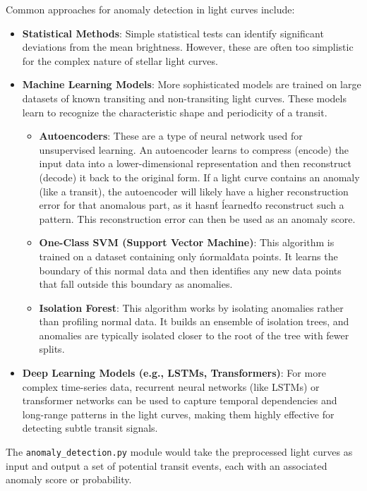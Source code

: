 \documentclass{article}
\begin{document}
Common approaches for anomaly detection in light curves include:

\begin{itemize}
    \item \textbf{Statistical Methods}: Simple statistical tests can identify significant deviations from the mean brightness. However, these are often too simplistic for the complex nature of stellar light curves.

    \item \textbf{Machine Learning Models}: More sophisticated models are trained on large datasets of known transiting and non-transiting light curves. These models learn to recognize the characteristic shape and periodicity of a transit.
    \begin{itemize}
        \item \textbf{Autoencoders}: These are a type of neural network used for unsupervised learning. An autoencoder learns to compress (encode) the input data into a lower-dimensional representation and then reconstruct (decode) it back to the original form. If a light curve contains an anomaly (like a transit), the autoencoder will likely have a higher reconstruction error for that anomalous part, as it hasn\'t \'learned\' to reconstruct such a pattern. This reconstruction error can then be used as an anomaly score.
        \item \textbf{One-Class SVM (Support Vector Machine)}: This algorithm is trained on a dataset containing only \'normal\' data points. It learns the boundary of this normal data and then identifies any new data points that fall outside this boundary as anomalies.
        \item \textbf{Isolation Forest}: This algorithm works by isolating anomalies rather than profiling normal data. It builds an ensemble of isolation trees, and anomalies are typically isolated closer to the root of the tree with fewer splits.
    \end{itemize}

    \item \textbf{Deep Learning Models (e.g., LSTMs, Transformers)}: For more complex time-series data, recurrent neural networks (like LSTMs) or transformer networks can be used to capture temporal dependencies and long-range patterns in the light curves, making them highly effective for detecting subtle transit signals.
\end{itemize}

The \texttt{anomaly\_detection.py} module would take the preprocessed light curves as input and output a set of potential transit events, each with an associated anomaly score or probability.
\end{document}

